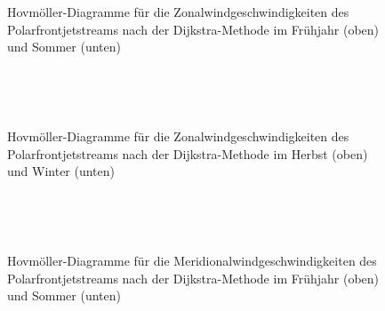 \begin{figure} %
  \centering
  \begin{minipage}{\textwidth}
  \end{minipage} \\ 
    \begin{minipage}{\textwidth}
  \end{minipage} \\ 
  \caption[Hovmöllerdiagramme des Zonalwinds des Polarfrontjets nach Dijkstra im Frühjahr und Sommer]{Hovmöller-Diagramme für die Zonalwindgeschwindigkeiten des Polarfrontjetstreams nach der Dijkstra-Methode im Frühjahr (oben) und Sommer (unten)}
\end{figure}

\begin{figure}
  \centering
  \begin{minipage}{\textwidth}
  \end{minipage} \\ 
    \begin{minipage}{\textwidth}
  \end{minipage} \\ 
  \caption[Hovmöllerdiagramme des Zonalwinds des Polarfrontjets nach Dijkstra im Herbst und Winter]{Hovmöller-Diagramme für die Zonalwindgeschwindigkeiten des Polarfrontjetstreams nach der Dijkstra-Methode im Herbst (oben) und Winter (unten)}
\end{figure}

\begin{figure} %
  \centering
  \begin{minipage}{\textwidth}
  \end{minipage} \\ 
    \begin{minipage}{\textwidth}
  \end{minipage} \\ 
  \caption[Hovmöllerdiagramme des Meridionalwinds des Polarfrontjets nach Dijkstra im Frühjahr und Sommer]{Hovmöller-Diagramme für die Meridionalwindgeschwindigkeiten des Polarfrontjetstreams nach der Dijkstra-Methode im Frühjahr (oben) und Sommer (unten)}
\end{figure}

